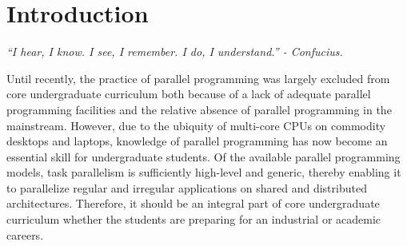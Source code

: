 \documentclass[9pt,twocolumn,letter]{article}
\begin{document}
\section{Introduction}
\begin{center}
\small{\textit{``I hear, I know. I see, I remember. I do, I understand.'' -
Confucius.}}
\end{center}
%
Until recently, the practice of parallel programming was largely excluded from
core undergraduate curriculum both because of a lack of adequate parallel
programming facilities and the relative absence of parallel programming in the
mainstream.
%
However, due to the ubiquity of multi-core CPUs on commodity desktops and
laptops, knowledge of parallel programming has now become an essential skill
for undergraduate students. 
%
% 
%
Of the available parallel programming models, task parallelism is sufficiently
high-level and generic, thereby enabling it to parallelize regular and
irregular applications on shared and distributed architectures.  
%
Therefore, it should be an integral part of core undergraduate curriculum
whether the students are preparing for an industrial or academic careers.
\end{document}
